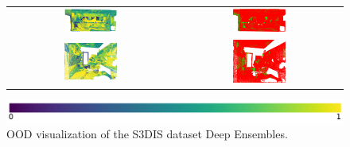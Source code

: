 \begin{figure}[h!]
\begin{tabular}{cc}
            \includegraphics[width=0.33\textwidth, height=0.18\textheight]{images/ood_imgs/de_s3dis/pnt_1_de_ent.pdf}& 
            \includegraphics[width=0.33\textwidth, height=0.18\textheight]{images/ood_imgs/de_s3dis/de_ent_3.pdf}\\

            \includegraphics[width=0.33\textwidth, height=0.18\textheight]{images/ood_imgs/de_s3dis/ofc_42_de_ent.pdf}& 
            \includegraphics[width=0.33\textwidth, height=0.18\textheight]{images/ood_imgs/de_s3dis/de_ent_1.pdf}\\
        \end{tabular}
        \includegraphics[scale=0.45]{images/prob_legend.pdf}
        \caption{OOD visualization of the S3DIS dataset Deep Ensembles.}
        \label{fig:de_s3dis_oodmap_ent}
    \end{figure}
